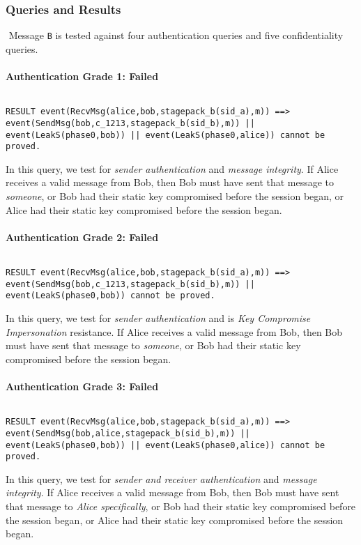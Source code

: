 \subsubsection{Queries and Results}$ $
Message \texttt{B} is tested against four authentication queries and five confidentiality queries.
\paragraph{Authentication Grade 1: Failed}$ $
\begin{lstlisting}
RESULT event(RecvMsg(alice,bob,stagepack_b(sid_a),m)) ==> event(SendMsg(bob,c_1213,stagepack_b(sid_b),m)) || event(LeakS(phase0,bob)) || event(LeakS(phase0,alice)) cannot be proved.
\end{lstlisting}

In this query, we test for \emph{sender authentication} and \emph{message integrity}. If Alice receives a valid message from Bob, then Bob must have sent that message to \emph{someone}, or Bob had their static key compromised before the session began, or Alice had their static key compromised before the session began.


\paragraph{Authentication Grade 2: Failed}$ $
\begin{lstlisting}
RESULT event(RecvMsg(alice,bob,stagepack_b(sid_a),m)) ==> event(SendMsg(bob,c_1213,stagepack_b(sid_b),m)) || event(LeakS(phase0,bob)) cannot be proved.
\end{lstlisting}

In this query, we test for \emph{sender authentication} and is \emph{Key Compromise Impersonation} resistance. If Alice receives a valid message from Bob, then Bob must have sent that message to \emph{someone}, or Bob had their static key compromised before the session began.


\paragraph{Authentication Grade 3: Failed}$ $
\begin{lstlisting}
RESULT event(RecvMsg(alice,bob,stagepack_b(sid_a),m)) ==> event(SendMsg(bob,alice,stagepack_b(sid_b),m)) || event(LeakS(phase0,bob)) || event(LeakS(phase0,alice)) cannot be proved.
\end{lstlisting}

In this query, we test for \emph{sender and receiver authentication} and \emph{message integrity}. If Alice receives a valid message from Bob, then Bob must have sent that message to \emph{Alice specifically}, or Bob had their static key compromised before the session began, or Alice had their static key compromised before the session began.


